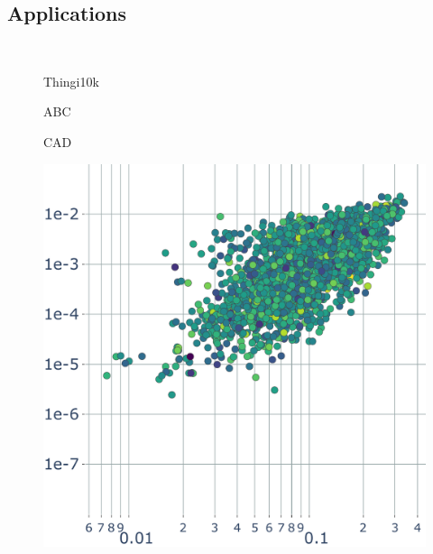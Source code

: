 \subsection{Applications}\label{sec:application}


\begin{figure}
    \centering
    \parbox{0.01\linewidth}{~}\hfill\hfill
    \parbox{.3\linewidth}{\centering Thingi10k}\hfill
    \parbox{.3\linewidth}{\centering ABC}\hfill
    \parbox{.3\linewidth}{\centering CAD}\par
    \parbox{0.01\linewidth}{\centering{}}\hfill\hfill
    \parbox{.3\linewidth}{\includegraphics[width=\linewidth]{curve_meshing_in_shell_tex/figs/stats/error_Thingi10k}}\hfill

\end{figure}
